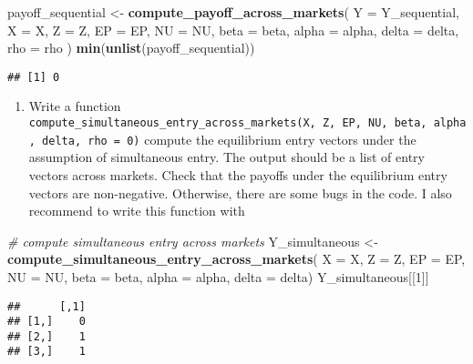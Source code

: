 \documentclass[
]{book}
\newenvironment{Shaded}{\begin{snugshade}}{\end{snugshade}}
\newcommand{\AttributeTok}[1]{\textcolor[rgb]{0.13,0.29,0.53}{#1}}
\newcommand{\CommentTok}[1]{\textcolor[rgb]{0.56,0.35,0.01}{\textit{#1}}}
\newcommand{\DecValTok}[1]{\textcolor[rgb]{0.00,0.00,0.81}{#1}}
\newcommand{\FunctionTok}[1]{\textcolor[rgb]{0.13,0.29,0.53}{\textbf{#1}}}
\newcommand{\NormalTok}[1]{#1}
\newcommand{\OtherTok}[1]{\textcolor[rgb]{0.56,0.35,0.01}{#1}}
\providecommand{\tightlist}{%
  \setlength{\itemsep}{0pt}\setlength{\parskip}{0pt}}
\begin{document}
\begin{Shaded}
\begin{Highlighting}[]
\NormalTok{payoff\_sequential }\OtherTok{\textless{}{-}}
  \FunctionTok{compute\_payoff\_across\_markets}\NormalTok{(}
    \AttributeTok{Y =}\NormalTok{ Y\_sequential, }
    \AttributeTok{X =}\NormalTok{ X, }
    \AttributeTok{Z =}\NormalTok{ Z, }
    \AttributeTok{EP =}\NormalTok{ EP, }
    \AttributeTok{NU =}\NormalTok{ NU, }
    \AttributeTok{beta =}\NormalTok{ beta, }
    \AttributeTok{alpha =}\NormalTok{ alpha, }
    \AttributeTok{delta =}\NormalTok{ delta, }
    \AttributeTok{rho =}\NormalTok{ rho}
\NormalTok{    )}
\FunctionTok{min}\NormalTok{(}\FunctionTok{unlist}\NormalTok{(payoff\_sequential))}
\end{Highlighting}
\end{Shaded}

\begin{verbatim}
## [1] 0
\end{verbatim}

\begin{enumerate}
\def\labelenumi{\arabic{enumi}.}
\setcounter{enumi}{7}
\tightlist
\item
  Write a function \texttt{compute\_simultaneous\_entry\_across\_markets(X,\ Z,\ EP,\ NU,\ beta,\ alpha,\ delta,\ rho\ =\ 0)} compute the equilibrium entry vectors under the assumption of simultaneous entry. The output should be a list of entry vectors across markets. Check that the payoffs under the equilibrium entry vectors are non-negative. Otherwise, there are some bugs in the code. I also recommend to write this function with
\end{enumerate}

\begin{Shaded}
\begin{Highlighting}[]
\CommentTok{\# compute simultaneous entry across markets}
\NormalTok{Y\_simultaneous }\OtherTok{\textless{}{-}}
  \FunctionTok{compute\_simultaneous\_entry\_across\_markets}\NormalTok{(}
    \AttributeTok{X =}\NormalTok{ X, }
    \AttributeTok{Z =}\NormalTok{ Z, }
    \AttributeTok{EP =}\NormalTok{ EP, }
    \AttributeTok{NU =}\NormalTok{ NU, }
    \AttributeTok{beta =}\NormalTok{ beta, }
    \AttributeTok{alpha =}\NormalTok{ alpha, }
    \AttributeTok{delta =}\NormalTok{ delta)}
\NormalTok{Y\_simultaneous[[}\DecValTok{1}\NormalTok{]]}
\end{Highlighting}
\end{Shaded}

\begin{verbatim}
##      [,1]
## [1,]    0
## [2,]    1
## [3,]    1
\end{verbatim}
\end{document}
